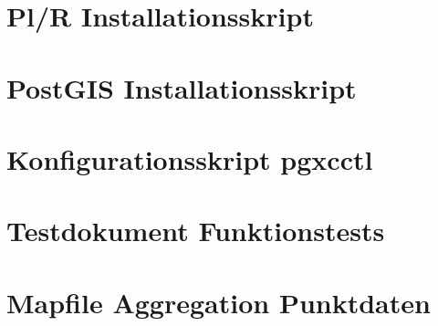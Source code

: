 \section{Pl/R Installationsskript}

\newpage
\section{PostGIS Installationsskript}

\newpage
\section{Konfigurationsskript pgxcctl}

\newpage
\section{Testdokument Funktionstests}

\newpage
\section{Mapfile Aggregation Punktdaten}

												

\pagestyle{empty}


